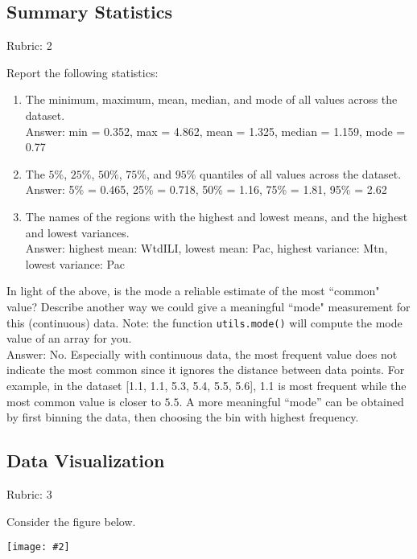\documentclass{article}
\newcommand{\ans}[1]{\green{Answer: #1}}
\newcommand{\rubric}[1]{\green{Rubric: #1}}
\newcommand{\blue}[1]{{\color{blue}#1}}
\newcommand{\green}[1]{{\color{green}#1}}
\newcommand{\fig}[2]{\texttt{[image: \#2]}}
\begin{document}
    \subsection{Summary Statistics}
    \rubric{2}

    \blue{Report the following statistics}:
    \begin{enumerate}
        \item The minimum, maximum, mean, median, and mode of all values across the dataset.\\
            \ans{min = 0.352, max = 4.862, mean = 1.325, median = 1.159, mode = 0.77}

        \item The $5\%$, $25\%$, $50\%$, $75\%$, and $95\%$ quantiles of all values across the dataset.\\
            \ans{5\% = 0.465, 25\% = 0.718, 50\% = 1.16, 75\% = 1.81, 95\% = 2.62}
        \item The names of the regions with the highest and lowest means, and the highest and lowest variances.\\
            \ans{highest mean: WtdILI, lowest mean: Pac, highest variance: Mtn, lowest variance: Pac}
    \end{enumerate}

    In light of the above, \blue{is the mode a reliable estimate of the most ``common" value? Describe another way we could give a meaningful ``mode" measurement for this (continuous) data.} Note: the function \texttt{utils.mode()} will compute the mode value of an array for you.\\
    \ans{No. Especially with continuous data, the most frequent value does not indicate the most common since it ignores the distance between data points. For example, in the dataset [1.1, 1.1, 5.3, 5.4, 5.5, 5.6], 1.1 is most frequent while the most common value is closer to $5.5$. A more meaningful ``mode'' can be obtained by first binning the data, then choosing the bin with highest frequency.}


    \subsection{Data Visualization}
    \rubric{3}

    Consider the figure below.

    \fig{1}{../figs/visualize-unlabeled}
\end{document}
